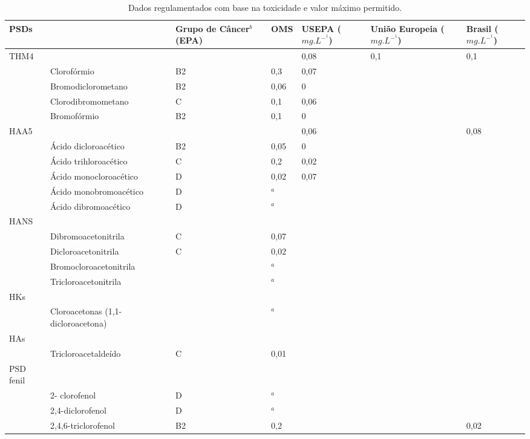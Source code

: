 \begin{table}[!htb]
\begin{flushleft}
\small
\caption{Dados regulamentados com base na toxicidade e valor máximo permitido.} \label{tab:com_esp}
\begin{tabular}{p{0.9cm}p{3.8cm}p{2.5cm}p{1cm}p{1.5cm}p{1.75cm}p{1.5cm}}
\toprule
\textbf{PSDs} & & \textbf{Grupo de Câncer$^b$ (EPA)} & \textbf{OMS} & \textbf{USEPA} ($mg.L^-^1$) & \textbf{União Europeia} ($mg.L^-^1$) & \textbf{Brasil} ($mg.L^-^1$) \\
\midrule
THM4 & & & & 0,08 & 0,1 & 0,1\\ 
& Clorofórmio & B2 & 0,3 & 0,07 & & \\ 
& Bromodiclorometano & B2 & 0,06 & 0 & & \\ 
& Clorodibromometano & C & 0,1 & 0,06 & & \\
& Bromofórmio & B2 & 0,1 & 0 & & \\
\hline
HAA5 & & & & 0,06 & & 0,08\\
& Ácido dicloroacético & B2 & 0,05 & 0 & &\\
& Ácido trihloroacético & C & 0,2 & 0,02 & & \\
& Ácido monocloroacético & D & 0,02 & 0,07 & &\\
& Ácido monobromoacético & D & $^a$ & & & \\
& Ácido dibromoacético & D & $^a$ & & & \\\hline
HANS & & & & & & \\
& Dibromoacetonitrila & C & 0,07 & & & \\
& Dicloroacetonitrila & C & 0,02 & & & \\
& Bromocloroacetonitrila & & $^a$ & & &\\
& Tricloroacetonitrila & & $^a$ & & &\\\hline
HKs & & & & & & \\
& Cloroacetonas (1,1-dicloroacetona) & & $^a$ & & &\\\hline
HAs  & & & & & & \\
& Tricloroacetaldeído & C & 0,01 & & & \\\hline
PSD fenil & & & & & & \\
& 2- clorofenol & D & $^a$ & & &\\
& 2,4-diclorofenol & D & $^a$ & & &\\
& 2,4,6-triclorofenol & B2 & 0,2 & & & 0,02\\
\bottomrule
\end{tabular}
\end{flushleft}
\end{table}

